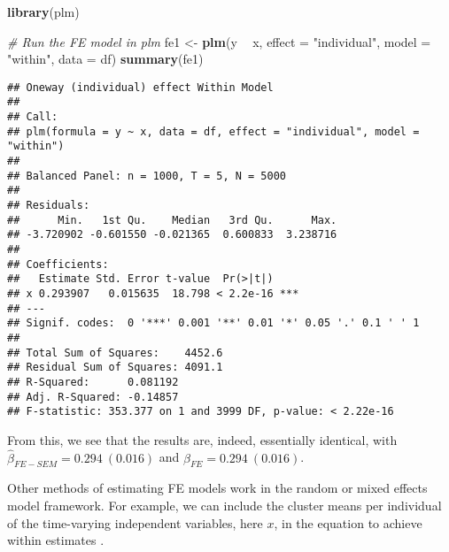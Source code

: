 \documentclass[]{interact}
\theoremstyle{plain}%
\theoremstyle{definition}
\theoremstyle{remark}
\newenvironment{Shaded}{\begin{snugshade}}{\end{snugshade}}
\newcommand{\CommentTok}[1]{\textcolor[rgb]{0.56,0.35,0.01}{\textit{#1}}}
\newcommand{\DataTypeTok}[1]{\textcolor[rgb]{0.13,0.29,0.53}{#1}}
\newcommand{\KeywordTok}[1]{\textcolor[rgb]{0.13,0.29,0.53}{\textbf{#1}}}
\newcommand{\NormalTok}[1]{#1}
\newcommand{\OperatorTok}[1]{\textcolor[rgb]{0.81,0.36,0.00}{\textbf{#1}}}
\newcommand{\StringTok}[1]{\textcolor[rgb]{0.31,0.60,0.02}{#1}}
\begin{document}
\singlespacing

\begin{Shaded}
\begin{Highlighting}[]
\KeywordTok{library}\NormalTok{(plm)}

\CommentTok{# Run the FE model in plm }
\NormalTok{fe1 <-}\StringTok{ }\KeywordTok{plm}\NormalTok{(y }\OperatorTok{~}\StringTok{ }\NormalTok{x, }
           \DataTypeTok{effect =} \StringTok{"individual"}\NormalTok{, }\DataTypeTok{model =} \StringTok{"within"}\NormalTok{, }
           \DataTypeTok{data =}\NormalTok{ df)}
\KeywordTok{summary}\NormalTok{(fe1)}
\end{Highlighting}
\end{Shaded}

\begin{verbatim}
## Oneway (individual) effect Within Model
## 
## Call:
## plm(formula = y ~ x, data = df, effect = "individual", model = "within")
## 
## Balanced Panel: n = 1000, T = 5, N = 5000
## 
## Residuals:
##      Min.   1st Qu.    Median   3rd Qu.      Max. 
## -3.720902 -0.601550 -0.021365  0.600833  3.238716 
## 
## Coefficients:
##   Estimate Std. Error t-value  Pr(>|t|)    
## x 0.293907   0.015635  18.798 < 2.2e-16 ***
## ---
## Signif. codes:  0 '***' 0.001 '**' 0.01 '*' 0.05 '.' 0.1 ' ' 1
## 
## Total Sum of Squares:    4452.6
## Residual Sum of Squares: 4091.1
## R-Squared:      0.081192
## Adj. R-Squared: -0.14857
## F-statistic: 353.377 on 1 and 3999 DF, p-value: < 2.22e-16
\end{verbatim}

\doublespacing

From this, we see that the results are, indeed, essentially identical,
with \(\hat{\beta}_{FE-SEM} =0.294 \ (0.016)\) and
\(\hat{\beta}_{FE} = 0.294 \ (0.016)\).

Other methods of estimating FE models work in the random or mixed
effects model framework. For example, we can include the cluster means
per individual of the time-varying independent variables, here \(x\), in
the equation to achieve within estimates
\citep{Mundlak1978, Chamberlain1980, Wooldridge2002}.

\singlespacing

\begin{Shaded}
\end{Shaded}
\end{document}
